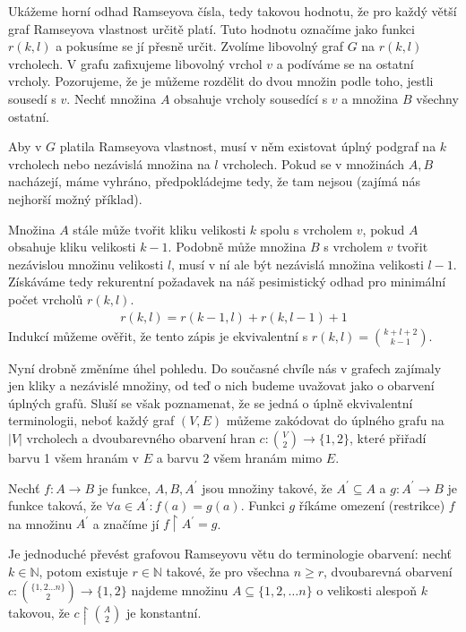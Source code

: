 \begin{t_proof}
  Ukážeme horní odhad Ramseyova čísla, tedy takovou hodnotu, že pro každý větší graf Ramseyova vlastnost určitě platí. Tuto hodnotu označíme jako funkci $r(k,l)$ a pokusíme se jí přesně určit. Zvolíme libovolný graf $G$ na $r(k,l)$ vrcholech. V grafu zafixujeme libovolný vrchol $v$ a podíváme se na ostatní vrcholy. Pozorujeme, že je můžeme rozdělit do dvou množin podle toho, jestli sousedí s $v$. Nechť množina $A$ obsahuje vrcholy sousedící s $v$ a množina $B$ všechny ostatní.
  
  Aby v $G$ platila Ramseyova vlastnost, musí v něm existovat úplný podgraf na $k$ vrcholech nebo nezávislá množina na $l$ vrcholech. Pokud se v množinách $A,B$ nacházejí, máme vyhráno, předpokládejme tedy, že tam nejsou (zajímá nás nejhorší možný příklad). 
  
  Množina $A$ stále může tvořit kliku velikosti $k$ spolu s vrcholem $v$, pokud $A$ obsahuje kliku velikosti $k-1$. Podobně může množina $B$ s vrcholem $v$ tvořit nezávislou množinu velikosti $l$, musí v ní ale být nezávislá množina velikosti $l-1$. Získáváme tedy rekurentní požadavek na náš pesimistický odhad pro minimální počet vrcholů $r(k,l)$.
  \begin{align*}
    r(k,l)=r(k-1,l)+r(k,l-1)+1
  \end{align*}
  Indukcí můžeme ověřit, že tento zápis je ekvivalentní s $r(k,l)=\binom{k+l+2}{k-1}$.
\end{t_proof}

Nyní drobně změníme úhel pohledu. Do současné chvíle nás v grafech zajímaly jen kliky a nezávislé množiny, od teď o nich budeme uvažovat jako o obarvení úplných grafů. Sluší se však poznamenat, že se jedná o úplně ekvivalentní terminologii, neboť každý graf $(V,E)$ můžeme zakódovat do úplného grafu na $|V|$ vrcholech a dvoubarevného obarvení hran $c:\binom{V}{2}\rightarrow\{1,2\}$, které přiřadí barvu 1 všem hranám v $E$ a barvu 2 všem hranám mimo $E$.  

\begin{t_definition}
  Nechť $f:A\rightarrow B$ je funkce, $A,B,A^\prime$ jsou množiny takové, že $A^\prime\subseteq A$ a $g: A^\prime\rightarrow B$ je funkce taková, že $\forall a\in A^\prime:f(a)=g(a)$. Funkci $g$ říkáme omezení (restrikce) $f$ na množinu $A^\prime$ a značíme jí $f\restriction A^\prime=g$.
\end{t_definition}

\begin{t_remark}
  Je jednoduché převést grafovou Ramseyovu větu do terminologie obarvení: nechť $k\in\mathbb{N}$, potom existuje $r\in\mathbb{N}$ takové, že pro všechna $n\geq r$, dvoubarevná obarvení $c:\binom{\{1,2\dots n\}}{2}\rightarrow\{1,2\}$ najdeme množinu $A\subseteq\{1,2,\dots n\}$ o velikosti alespoň $k$ takovou, že $c\restriction\binom{A}{2}$ je konstantní.
\end{t_remark}

